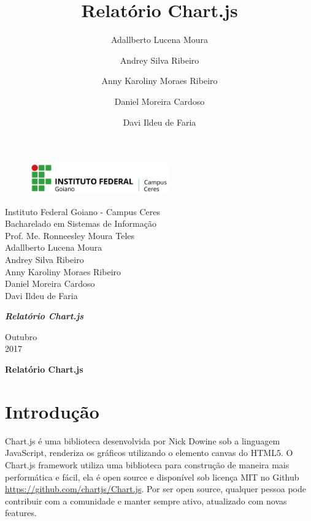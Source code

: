 \documentclass[12pt,a4paper]{article}
\title{Relatório Chart.js}
\author{Adallberto Lucena Moura \and Andrey Silva Ribeiro \and Anny Karoliny Moraes Ribeiro \and Daniel Moreira Cardoso \and Davi Ildeu de Faria}
\begin{document}
\begin{titlepage}


\begin{center}
\begin{figure}[htb]
		
		\label{figura:LogoIF}
	
		\centering
		\includegraphics[width=6cm]{logo.png} 
\end{figure}


Instituto Federal Goiano - Campus Ceres\\
Bacharelado em Sistemas de Informação\\
Prof. Me. Ronneesley Moura Teles\\\vspace{0.2cm}
Adallberto Lucena Moura \\
Andrey Silva Ribeiro \\
Anny Karoliny Moraes Ribeiro \\
Daniel Moreira Cardoso \\
Davi Ildeu de Faria \\

\vspace{5.0cm}

\textit{\textbf{\Large{Relatório Chart.js}}}\\\vspace{0.5cm}
\vspace{9.5cm}

Outubro\\
2017\\
\end{center}
\end{titlepage}



\tableofcontents

\newpage
\begin{center}
\textbf{\Large{Relatório Chart.js}}\\\vspace{0.5cm}
\end{center}

\section{Introdução}

Chart.js é uma biblioteca desenvolvida por Nick Dowine sob a linguagem JavaScript, renderiza os gráficos utilizando o elemento canvas do HTML5. O Chart.js framework utiliza uma biblioteca para construção de maneira mais performática e fácil, ela é open source e disponível sob licença MIT no Github \url{https://github.com/chartjs/Chart.js}. Por ser open source, qualquer pessoa pode contribuir com a comunidade e manter sempre ativo, atualizado com novas features.
\end{document}

